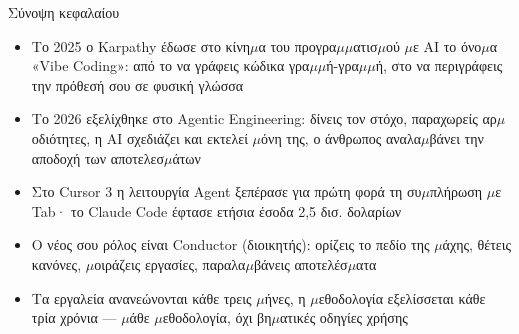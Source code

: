 \begin{tcbsummary}{Σύνοψη κεφαλαίου}
\begin{itemize}
  \item Το 2025 ο Karpathy έδωσε στο κίνη$\mu$α του προγρα$\mu$$\mu$ατισ$\mu$ού $\mu$ε AI το όνο$\mu$α «Vibe Coding»: από το να γράφεις κώδικα γρα$\mu$$\mu$ή-γρα$\mu$$\mu$ή, στο να περιγράφεις την πρόθεσή σου σε φυσική γλώσσα
  \item Το 2026 εξελίχθηκε στο Agentic Engineering: δίνεις τον στόχο, παραχωρείς αρ$\mu$οδιότητες, η AI σχεδιάζει και εκτελεί $\mu$όνη της, ο άνθρωπος αναλα$\mu$βάνει την αποδοχή των αποτελεσ$\mu$άτων
  \item Στο Cursor 3 η λειτουργία Agent ξεπέρασε για πρώτη φορά τη συ$\mu$πλήρωση $\mu$ε Tab· το Claude Code έφτασε ετήσια έσοδα 2,5 δισ. δολαρίων
  \item Ο νέος σου ρόλος είναι Conductor (διοικητής): ορίζεις το πεδίο της $\mu$άχης, θέτεις κανόνες, $\mu$οιράζεις εργασίες, παραλα$\mu$βάνεις αποτελέσ$\mu$ατα
  \item Τα εργαλεία ανανεώνονται κάθε τρεις $\mu$ήνες, η $\mu$εθοδολογία εξελίσσεται κάθε τρία χρόνια — $\mu$άθε $\mu$εθοδολογία, όχι βη$\mu$ατικές οδηγίες χρήσης
\end{itemize}

\end{tcbsummary}
